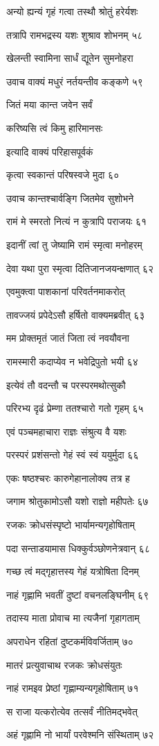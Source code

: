 अन्यो ह्यन्यं गृहं गत्वा तस्थौ श्रोतुं हरेर्यशः

तत्रापि रामभद्रस्य यशः शुश्राव शोभनम् ५८

खेलन्ती स्वामिना सार्धं द्यूतेन सुमनोहरा

उवाच वाक्यं मधुरं नर्तयन्तीव कङ्कणे ५९

जितं मया कान्त जवेन सर्वं

करिष्यसि त्वं किमु हारिमानसः

इत्यादि वाक्यं परिहासपूर्वकं

कृत्वा स्वकान्तं परिषस्वजे मुदा ६०

उवाच कान्तश्चार्वङ्गि जितमेव सुशोभने

रामं मे स्मरतो नित्यं न कुत्रापि पराजयः ६१

इदानीं त्वां तु जेष्यामि रामं स्मृत्वा मनोहरम्

देवा यथा पुरा स्मृत्वा दितिजानजयन्क्षणात् ६२

एवमुक्त्वा पाशकानां परिवर्तनमाकरोत्

तावज्जयं प्रपेदेऽसौ हर्षितो वाक्यमब्रवीत् ६३

मम प्रोक्तमृतं जातं जिता त्वं नवयौवना

रामस्मारी कदाप्येव न भवेद्रिपुतो भयी ६४

इत्येवं तौ वदन्तौ च परस्परमथोत्सुकौ

परिरभ्य दृढं प्रेम्णा ततश्चारो गतो गृहम् ६५

एवं पञ्चमहाचारा राज्ञः संश्रुत्य वै यशः

परस्परं प्रशंसन्तो गेहं स्वं स्वं ययुर्मुदा ६६

एकः षष्ठश्चरः कारुगेहानालोक्य तत्र ह

जगाम श्रोतुकामोऽसौ यशो राज्ञो महीपतेः ६७

रजकः क्रोधसंस्पृष्टो भार्यामन्यगृहोषिताम्

पदा सन्ताडयामास धिक्कुर्वञ्छोणनेत्रवान् ६८

गच्छ त्वं मद्गृहात्तस्य गेहं यत्रोषिता दिनम्

नाहं गृह्णामि भवतीं दुष्टां वचनलङ्घिनीम् ६९

तदास्य माता प्रोवाच मा त्यजैनां गृहागताम्

अपराधेन रहितां दुष्टकर्मविवर्जिताम् ७०

मातरं प्रत्युवाचाथ रजकः क्रोधसंयुतः

नाहं रामइव प्रेष्ठां गृह्णाम्यन्यगृहोषिताम् ७१

स राजा यत्करोत्येव तत्सर्वं नीतिमद्भवेत्

अहं गृह्णामि नो भार्यां परवेश्मनि संस्थिताम् ७२

